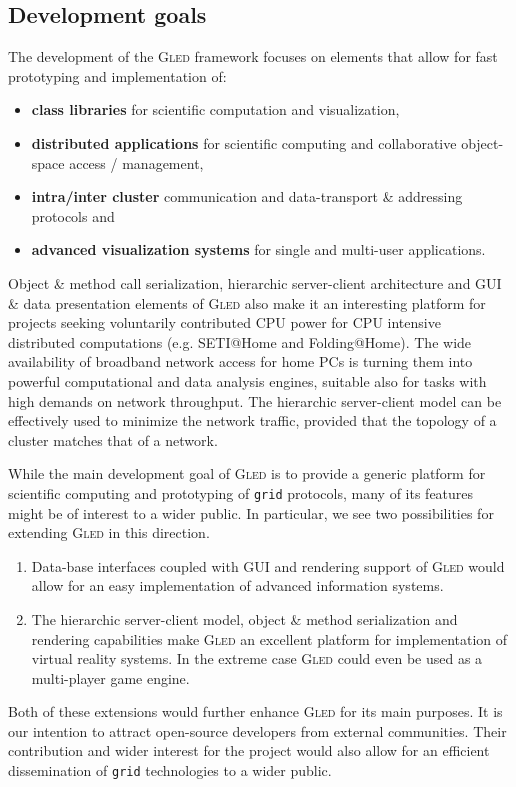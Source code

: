 \documentclass[a4paper,11pt]{article}
\def\gled{\textsc{Gled}\xspace}
\def\grid{\texttt{grid}\xspace}
\begin{document}
\subsection{Development goals}

The development of the \gled framework focuses on elements that allow
for fast prototyping and implementation of:

\begin{itemize}
\item \textbf{class libraries} for scientific computation and visualization,
\item \textbf{distributed applications} for scientific computing and
  collaborative object-space access / ma\-nage\-ment,
\item \textbf{intra/inter cluster} communication and
  data-transport \& addressing protocols and
\item \textbf{advanced visualization systems} for single and
  multi-user applications.
\end{itemize}

Object \& method call serialization, hierarchic server-client
architecture and GUI \& data presentation elements of \gled also make
it an interesting platform for projects seeking voluntarily contributed
CPU power for CPU intensive distributed computations (e.g.
SETI@Home\cite{seti} and Folding@Home\cite{folding}). The wide
availability of broadband network access for home PCs is turning them
into powerful computational and data analysis engines, suitable also
for tasks with high demands on network throughput. The hierarchic
server-client model can be effectively used to minimize the network
traffic, provided that the topology of a cluster matches that of a
network.

While the main development goal of \gled is to provide a generic
platform for scientific computing and prototyping of \grid protocols,
many of its features might be of interest to a wider public. In
particular, we see two possibilities for extending \gled in this
direction.
\begin{enumerate}
\item Data-base interfaces coupled with GUI and rendering support of \gled
  would allow for an easy implementation of advanced information
  systems.
\item The hierarchic server-client model, object \& method
  serialization and rendering capabilities make \gled an excellent
  platform for implementation of virtual reality systems. In the
  extreme case \gled could even be used as a multi-player game engine.
\end{enumerate}
Both of these extensions would further enhance \gled for its
main purposes. It is our intention to attract open-source developers
from external communities. Their contribution and wider interest for
the project would also allow for an efficient dissemination of \grid
technologies to a wider public.
\end{document}
